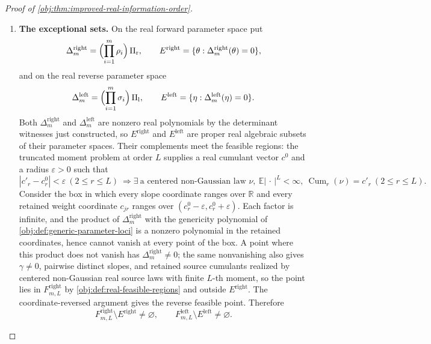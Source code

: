 \documentclass[11pt]{article}
\begin{document}
\begin{proof}[Proof of \cref{obj:thm:improved-real-information-order}]
\begin{enumerate}
\item \textbf{The exceptional sets.}  On the real forward parameter space put
\[
\Delta^{\mathrm{right}}_m=\Bigl(\prod_{i=1}^m\rho_i\Bigr)\,\Pi_{\mathrm r},
\qquad
E^{\mathrm{right}}=\{\theta:\Delta^{\mathrm{right}}_m(\theta)=0\},
\]
and on the real reverse parameter space
\[
\Delta^{\mathrm{left}}_m=\Bigl(\prod_{i=1}^m\sigma_i\Bigr)\,\Pi_{\mathrm l},
\qquad
E^{\mathrm{left}}=\{\eta:\Delta^{\mathrm{left}}_m(\eta)=0\}.
\]
Both \(\Delta^{\mathrm{right}}_m\) and \(\Delta^{\mathrm{left}}_m\) are nonzero real polynomials by the determinant witnesses just constructed, so \(E^{\mathrm{right}}\) and \(E^{\mathrm{left}}\) are proper real algebraic subsets of their parameter spaces.  Their complements meet the feasible regions: the truncated moment problem at order \(L\) supplies a real cumulant vector \(c^{0}\) and a radius \(\varepsilon>0\) such that
\[
|c'_r-c^{0}_r|<\varepsilon\ (2\le r\le L)
\ \Longrightarrow
\exists\ \text{a centered non-Gaussian law }\nu,\ \mathbb E|\,\cdot\,|^{L}<\infty,\ \operatorname{Cum}_r(\nu)=c'_r\ (2\le r\le L).
\]
Consider the box in which every slope coordinate ranges over \(\mathbb R\) and every retained weight coordinate \(c_{jr}\) ranges over \((c^{0}_r-\varepsilon,c^{0}_r+\varepsilon)\).  Each factor is infinite, and the product of \(\Delta^{\mathrm{right}}_m\) with the genericity polynomial of \cref{obj:def:generic-parameter-loci} is a nonzero polynomial in the retained coordinates, hence cannot vanish at every point of the box.  A point where this product does not vanish has \(\Delta^{\mathrm{right}}_m\ne0\); the same nonvanishing also gives \(\gamma\ne0\), pairwise distinct slopes, and retained source cumulants realized by centered non-Gaussian real source laws with finite \(L\)-th moment, so the point lies in \(F^{\mathrm{right}}_{m,L}\) by \cref{obj:def:real-feasible-regions} and outside \(E^{\mathrm{right}}\).  The coordinate-reversed argument gives the reverse feasible point.  Therefore
\[
F^{\mathrm{right}}_{m,L}\setminus E^{\mathrm{right}}\ne\varnothing,
\qquad
F^{\mathrm{left}}_{m,L}\setminus E^{\mathrm{left}}\ne\varnothing .
\]


\end{enumerate}
\end{proof}
\end{document}
